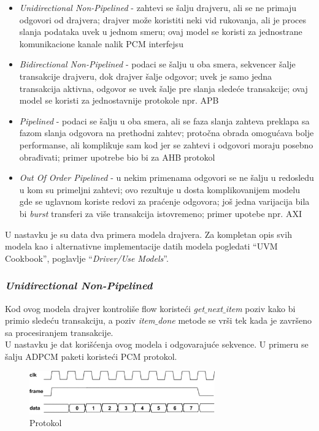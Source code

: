 \begin{itemize}
\item \emph{Unidirectional Non-Pipelined} - zahtevi se šalju drajveru, ali se ne
  primaju odgovori od drajvera; drajver može koristiti neki vid rukovanja, ali
  je proces slanja podataka uvek u jednom smeru; ovaj model se koristi za
  jednostrane komunikacione kanale nalik PCM interfejsu
\item \emph{Bidirectional Non-Pipelined} - podaci se šalju u oba smera,
  sekvencer šalje transakcije drajveru, dok drajver šalje odgovor; uvek je samo
  jedna transakcija aktivna, odgovor se uvek šalje pre slanja sledeće
  transakcije; ovaj model se koristi za jednostavnije protokole npr. APB
\item \emph{Pipelined} - podaci se šalju u oba smera, ali se faza slanja zahteva
  preklapa sa fazom slanja odgovora na prethodni zahtev; protočna obrada
  omogućava bolje performanse, ali komplikuje sam kod jer se zahtevi i odgovori
  moraju posebno obrađivati; primer upotrebe bio bi za AHB protokol
\item \emph{Out Of Order Pipelined} - u nekim primenama odgovori se ne šalju u
  redosledu u kom su primeljni zahtevi; ovo rezultuje u dosta komplikovanijem
  modelu gde se uglavnom koriste redovi za praćenje odgovora; još jedna
  varijacija bila bi \emph{burst} transferi za više transakcija istovremeno;
  primer upotebe npr. AXI
\end{itemize}

U nastavku je su data dva primera modela drajvera. Za kompletan opis svih modela
kao i alternativne implementacije datih modela pogledati ``UVM Cookbook'',
poglavlje ``\emph{Driver/Use Models}''.

\subsubsection{\emph{Unidirectional Non-Pipelined}}

Kod ovog modela drajver kontroliše flow koristeći \emph{get\(\_\)next\(\_\)item}
poziv kako bi primio sledeću transakciju, a poziv \emph{item\(\_\)done} metode
se vrši tek kada je završeno sa procesiranjem transakcije.\\

U nastavku je dat korišćenja ovog modela i odgovarajuće sekvence. U primeru se
šalju ADPCM paketi koristeći PCM protokol.\\

\begin{figure}[h!]
  \center
  \includegraphics[width=80mm, scale=0.5]{img/v7_unidir_protocol.png}
  \caption{Protokol}
  \label{fig:unidir_protocol}
\end{figure}

